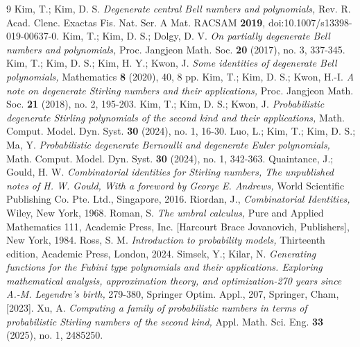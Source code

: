 \documentclass[a4paper,11pt]{amsart}
\begin{document}
\begin{thebibliography}{9}
Kim, T.; Kim, D. S. \emph{Degenerate central Bell numbers and polynomials,} Rev.  R.  Acad.  Clenc. Exactas Fis. Nat. Ser. A Mat. RACSAM \textbf{2019},  
doi:10.1007/s13398-019-00637-0.
Kim, T.; Kim, D. S.; Dolgy, D. V. \emph{On partially degenerate Bell numbers and polynomials,} Proc. Jangjeon Math. Soc. \textbf{20} (2017), no. 3, 337-345.
Kim, T.; Kim, D. S.; Kim, H. Y.; Kwon, J. \emph{Some identities of degenerate Bell polynomials,} Mathematics \textbf{8} (2020), 40, 8 pp.
Kim, T.; Kim, D. S.; Kwon, H.-I. \emph{A note on degenerate Stirling numbers and their applications,} Proc. Jangjeon Math. Soc. \textbf{21} (2018), no. 2, 195-203.
Kim, T.; Kim, D. S.; Kwon, J. \emph{Probabilistic degenerate Stirling polynomials of the second kind and their applications,} Math. Comput. Model. Dyn. Syst. \textbf{30} (2024), no. 1, 16-30.
Luo, L.; Kim, T.; Kim, D. S.; Ma, Y. \emph{Probabilistic degenerate Bernoulli and degenerate Euler polynomials,} Math. Comput. Model. Dyn. Syst. \textbf{30} (2024), no. 1, 342-363.
Quaintance, J.; Gould, H. W. \emph{Combinatorial identities for Stirling numbers, The unpublished  notes of H. W. Gould, With a foreword by George E. Andrews,} World Scientific Publishing Co. Pte. Ltd., Singapore, 2016.
Riordan, J., \emph{Combinatorial Identities,} Wiley, New York, 1968.
Roman, S. \emph{The umbral calculus,} Pure and Applied Mathematics 111, Academic Press, Inc. [Harcourt Brace Jovanovich, Publishers], New York, 1984. 
Ross, S. M. \emph{Introduction to probability models,} Thirteenth edition, Academic Press, London, 2024. 
Simsek, Y.; Kilar, N. \emph{Generating functions for the Fubini type polynomials and their applications. Exploring mathematical analysis, approximation theory, and optimization-270 years since A.-M. Legendre's birth,} 279-380, Springer Optim. Appl., 207, Springer, Cham, [2023].
Xu, A. \emph{Computing a family of probabilistic numbers in terms of probabilistic Stirling numbers of the second kind,} Appl. Math. Sci. Eng. \textbf{33} (2025), no. 1, 2485250.


\end{thebibliography}
\end{document}
